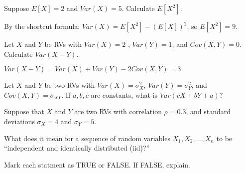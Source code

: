 \documentclass[addpoints,12pt]{exam}
\begin{document}
\begin{questions}
\question Suppose $E[X] = 2$ and $Var(X) = 5$. Calculate $E[X^2]$.
\begin{solution}
  By the shortcut formula: $Var(X) = E[X^2] - \left( E[X] \right)^2$, so $E[X^2] = 9$.
\end{solution}

\question Let $X$ and $Y$ be RVs with $Var(X) = 2$ , $Var(Y) = 1$, and $Cov(X,Y) = 0$. Calculate $Var(X - Y)$.
\begin{solution}
  $Var(X - Y) = Var(X) + Var(Y) - 2 Cov(X,Y) = 3$
\end{solution}

\question Let $X$ and $Y$ be two RVs with $Var(X) = \sigma_X^2$, $Var(Y) = \sigma_Y^2$, and $Cov(X,Y) = \sigma_{XY}$. If $a,b,c$ are constants, what is $Var(cX + bY + a)$?

\question Suppose that $X$ and $Y$ are two RVs with correlation $\rho = 0.3$, and standard deviations $\sigma_X = 4$ and $\sigma_Y = 5$.

\question What does it mean for a sequence of random variables $X_1, X_2, \dots, X_n$ to be ``independent and identically distributed (iid)?''

\question Mark each statment as TRUE or FALSE. If FALSE, explain.


\end{questions}
\end{document}
